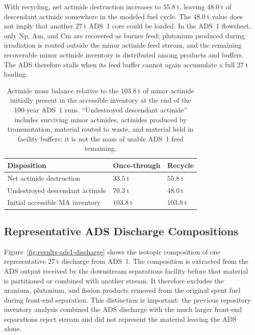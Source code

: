 With recycling, net actinide destruction increases to \(55.8~\mathrm{t}\), leaving
\(48.0~\mathrm{t}\) of descendant actinide somewhere in the modeled fuel cycle.
The \(48.0~\mathrm{t}\) value does not imply that another \(27~\mathrm{t}\)
ADS~1 core could be loaded. In the ADS~1 flowsheet, only Np, Am, and Cm
are recovered as burner feed; plutonium produced during irradiation is routed
outside the minor actinide feed stream, and the remaining recoverable
minor actinide inventory is distributed among products and buffers. The ADS
therefore stalls when its feed buffer cannot again accumulate a full
\(27~\mathrm{t}\) loading.

\begin{table}[htbp]
    \centering
    \caption{Actinide mass balance relative to the \(103.8~\mathrm{t}\) of minor
    actinide initially present in the accessible inventory at the end of the
    100-year ADS~1 runs. ``Undestroyed descendant actinide''
    includes surviving minor actinides, actinides produced by transmutation,
    material routed to waste, and material held in facility buffers; it is not
    the mass of usable ADS~1 feed remaining.}
    \label{tab:results-ma-fate}
    \begin{tabular}{p{} p{} p{}}
        \hline
        \textbf{Disposition} & \textbf{Once-through} & \textbf{Recycle} \\
        \hline
        Net actinide destruction          & \(33.5~\mathrm{t}\) & \(55.8~\mathrm{t}\) \\
        Undestroyed descendant actinide     & \(70.3~\mathrm{t}\) & \(48.0~\mathrm{t}\) \\
        \hline
        Initial accessible MA inventory     & \(103.8~\mathrm{t}\) & \(103.8~\mathrm{t}\) \\
        \hline
    \end{tabular}
\end{table}

\subsection{Representative ADS Discharge Compositions}
\label{subsec:results-fate-waste}

Figure~\ref{fig:results-ads1-discharge} shows the isotopic composition of one
representative \(27~\mathrm{t}\) discharge from ADS~1. The composition is
extracted from the ADS output received by the downstream separations facility
before that material is partitioned or combined with another stream. It
therefore excludes the uranium, plutonium, and fission products removed from the
original spent fuel during front-end separation. This distinction is important:
the previous repository inventory analysis combined the ADS discharge with the
much larger front-end separations reject stream and did not represent the
material leaving the ADS alone.

